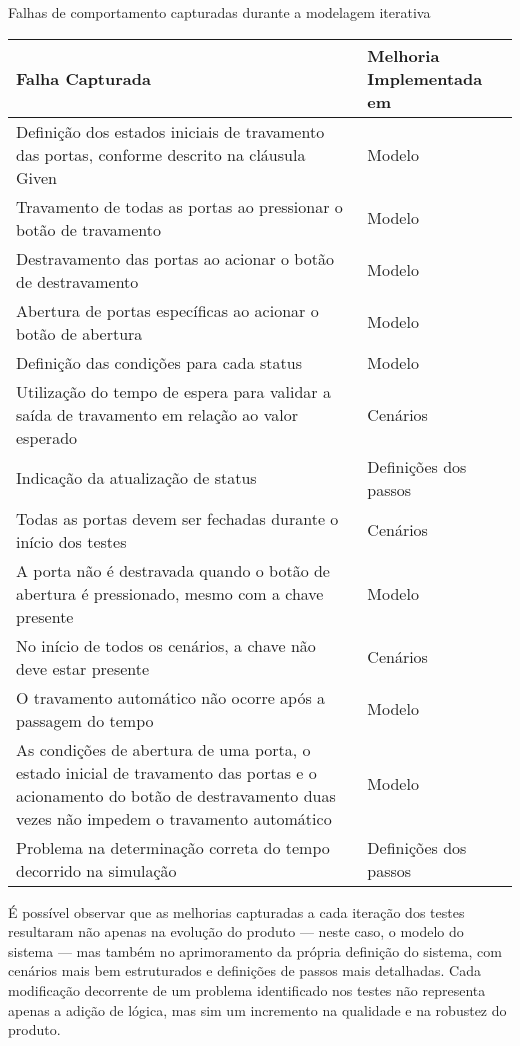 \begin{quadro}[H]
\caption{Falhas de comportamento capturadas durante a modelagem iterativa}
\label{qua:falhas}
\begin{tabular}{|p{5cm}|p{7cm}|}
\hline
Falha Capturada & Melhoria Implementada em \\ 
\hline
Definição dos estados iniciais de travamento das portas, conforme descrito na cláusula Given & Modelo \\
\hline
Travamento de todas as portas ao pressionar o botão de travamento & Modelo \\
\hline
Destravamento das portas ao acionar o botão de destravamento & Modelo \\
\hline
Abertura de portas específicas ao acionar o botão de abertura & Modelo \\
\hline
Definição das condições para cada status & Modelo \\
\hline
Utilização do tempo de espera para validar a saída de travamento em relação ao valor esperado & Cenários \\
\hline
Indicação da atualização de status & Definições dos passos \\
\hline
Todas as portas devem ser fechadas durante o início dos testes & Cenários \\
\hline
A porta não é destravada quando o botão de abertura é pressionado, mesmo com a chave presente & Modelo \\
\hline
No início de todos os cenários, a chave não deve estar presente & Cenários \\
\hline
O travamento automático não ocorre após a passagem do tempo & Modelo \\
\hline
As condições de abertura de uma porta, o estado inicial de travamento das portas e o acionamento do botão de destravamento duas vezes não impedem o travamento automático & Modelo \\
\hline
Problema na determinação correta do tempo decorrido na simulação & Definições dos passos  \\
\hline
\end{tabular}
\end{quadro}

É possível observar que as melhorias capturadas a cada iteração dos testes resultaram não apenas na evolução do produto — neste caso, o modelo do sistema — mas também 
no aprimoramento da própria definição do sistema, com cenários mais bem estruturados e definições de passos mais detalhadas. Cada modificação decorrente de um problema 
identificado nos testes não representa apenas a adição de lógica, mas sim um incremento na qualidade e na robustez do produto.


